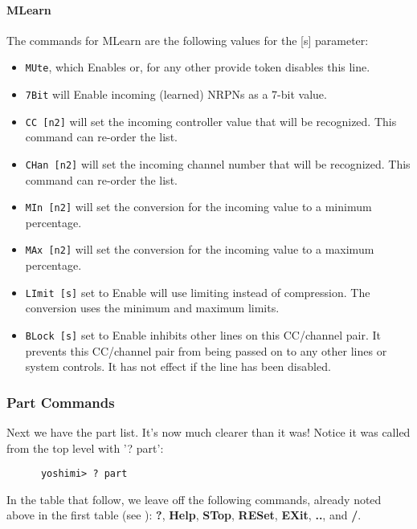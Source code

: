 \paragraph{MLearn}
\label{paragraph:command_line_mlearn}

   The commands for MLearn are the following values for the [s] parameter:

   \begin{itemize}
      \item \texttt{MUte}, which Enables or, for any other provide token
         disables this line.
      \item \texttt{7Bit} will Enable incoming (learned) NRPNs as a 7-bit value.
      \item \texttt{CC [n2]} will set the incoming controller value that will
         be recognized.  This command can re-order the list.
      \item \texttt{CHan [n2]} will set the incoming channel number that will
         be recognized.  This command can re-order the list.
      \item \texttt{MIn [n2]} will set the conversion for the incoming
         value to a minimum percentage.
      \item \texttt{MAx [n2]} will set the conversion for the incoming
         value to a maximum percentage.
      \item \texttt{LImit [s]} set to Enable will use limiting instead of
         compression.  The conversion uses the minimum and maximum limits.
      \item \texttt{BLock [s]} set to Enable inhibits other lines on this
         CC/channel pair.  It prevents this CC/channel pair from being passed
         on to any other lines or system controls.  It has not effect if the
         line has been disabled.
   \end{itemize}

\subsubsection{Part Commands}
\label{subsec:command_line_part_command_list}

   Next we have the part list. It's now much clearer than it was! Notice it was
   called from the top level with '? part':

   \begin{verbatim}
      yoshimi> ? part
   \end{verbatim}

   In the table that follow, we leave off the following commands, already noted
   above in the first table
   (see ):
   \textbf{?}, \textbf{Help}, \textbf{STop}, \textbf{RESet},
   \textbf{EXit}, \textbf{..}, and \textbf{/}.


